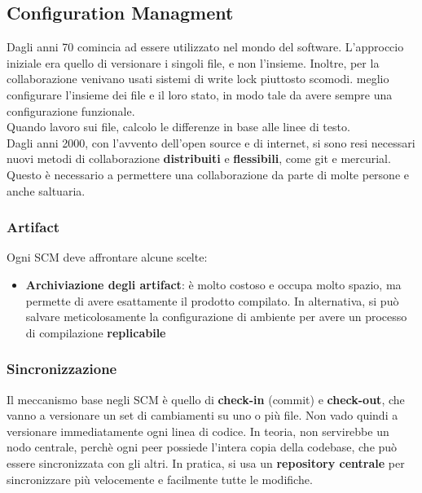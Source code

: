 \documentclass[a4paper,12pt]{article}
\begin{document}
\subsection{Configuration Managment}
\noindent Dagli anni 70 comincia ad essere utilizzato nel mondo del software.
\noindent L'approccio iniziale era quello di versionare i singoli file, e non l'insieme. Inoltre, per la collaborazione venivano usati sistemi di write lock piuttosto scomodi.
\vspace{0.3cm}
\noindent \E meglio configurare l'insieme dei file e il loro stato, in modo tale da avere sempre una configurazione funzionale.\\
Quando lavoro sui file, calcolo le differenze in base alle linee di testo.\\
Dagli anni 2000, con l'avvento dell'open source e di internet, si sono resi necessari nuovi metodi di collaborazione \textbf{distribuiti} e \textbf{flessibili}, come git e mercurial. Questo è necessario a permettere una collaborazione da parte di molte persone e anche saltuaria.

\subsubsection{Artifact}
Ogni SCM deve affrontare alcune scelte:
\begin{itemize}
\item \textbf{Archiviazione degli artifact}: è molto costoso e occupa molto spazio, ma permette di avere esattamente il prodotto compilato. In alternativa, si può salvare meticolosamente la configurazione di ambiente per avere un processo di compilazione \textbf{replicabile}
\end{itemize}

\subsubsection{Sincronizzazione}
Il meccanismo base negli SCM è quello di \textbf{check-in} (commit) e \textbf{check-out}, che vanno a versionare un set di cambiamenti su uno o più file. Non vado quindi a versionare immediatamente ogni linea di codice. In teoria, non servirebbe un nodo centrale, perchè ogni peer possiede l'intera copia della codebase, che può essere sincronizzata con gli altri. In pratica, si usa un \textbf{repository centrale} per sincronizzare più velocemente e facilmente tutte le modifiche.
\end{document}

